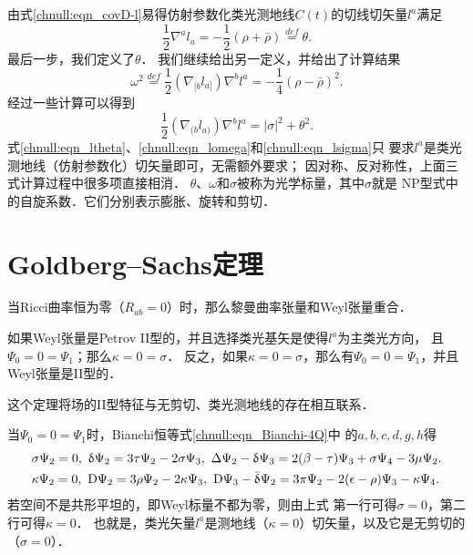 由式\eqref{chnull:eqn_covD-l}易得仿射参数化类光测地线$C(t)$的切线切矢量$l^a$满足
\begin{equation}\label{chnull:eqn_ltheta}
    \frac{1}{2}\nabla^{a} l_a =-\frac{1}{2} (\rho +\bar{\rho})
    \overset{def}{=} \theta .
\end{equation}
最后一步，我们定义了$\theta$．
我们继续给出另一定义，并给出了计算结果
\begin{equation}\label{chnull:eqn_lomega}
    \omega^2 \overset{def}{=} \frac{1}{2} (\nabla_{[b} l_{a]}) \nabla^{b} l^{a}
    = -\frac{1}{4}  (\rho - \bar{\rho})^2 .
\end{equation}
经过一些计算可以得到
\begin{equation}\label{chnull:eqn_lsigma}
    \frac{1}{2} (\nabla_{(b} l_{a)}) \nabla^{b} l^{a}
    =|\sigma|^2 + \theta^2 .
\end{equation}
式\eqref{chnull:eqn_ltheta}、\eqref{chnull:eqn_lomega}和\eqref{chnull:eqn_lsigma}只
要求$l^a$是类光测地线（仿射参数化）切矢量即可，无需额外要求；
因对称、反对称性，上面三式计算过程中很多项直接相消．
$\theta$、$\omega$和$\sigma$被称为{\heiti 光学标量}，其中$\sigma$就是
NP型式中的自旋系数．它们分别表示膨胀、旋转和剪切．




\section{Goldberg--Sachs定理}
当Ricci曲率恒为零（$R_{ab}=0$）时，那么黎曼曲率张量和Weyl张量重合．

\begin{theorem}\label{chnull:thm_Goldenberg-Sachs}
    如果Weyl张量是Petrov II型的，并且选择类光基矢是使得$l^a$为主类光方向，
    且$\Psi_0=0=\Psi_1$；那么$\kappa=0=\sigma$．
    反之，如果$\kappa=0=\sigma$，那么有$\Psi_0=0=\Psi_1$，并且Weyl张量是II型的．
\end{theorem}

这个定理将场的II型特征与无剪切、类光测地线的存在相互联系．

当$\Psi_0=0=\Psi_1$时，Bianchi恒等式\eqref{chnull:eqn_Bianchi-4Q}中
的$a,b,c,d,g,h$得
    \begin{align*}
        &  \sigma \Psi _{2} =0, \
        \updelta \Psi_{2}  =   3\tau \Psi_{2} - 2\sigma \Psi _{3}, \
        \Delta \Psi_{2}-\updelta \Psi_{3}
        =2(\beta -\tau )  \Psi_{3}+\sigma \Psi_{4} -3\mu \Psi_{2}.  \\
        &  \kappa \Psi _{2} =0,       \
        {\rm D}\Psi _{2} = 3\rho \Psi _{2}-2\kappa \Psi _{3},\
        {\rm D}\Psi_{3}-\bar{\updelta }\Psi_{2}
        = 3\pi \Psi_{2} -2(\epsilon -\rho )\Psi_{3} -\kappa \Psi_{4} .
    \end{align*}
若空间不是共形平坦的，即Weyl标量不都为零，则由上式
第一行可得$\sigma=0$，第二行可得$\kappa=0$．
也就是，类光矢量$l^a$是测地线（$\kappa=0$）切矢量，以及它是无剪切的（$\sigma=0$）．

